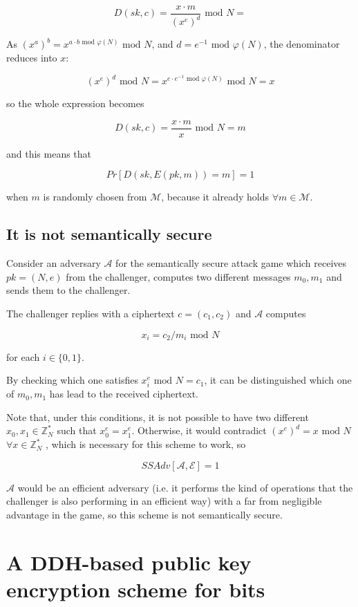 \documentclass{article}
\begin{document}
$$
  D(sk, c) = 
  \frac{ x \cdot m}
    {\left( x^e \right)^d} \text{ mod } N =
$$

As 
$(x^a)^b = x^{a \cdot b \text{ mod } \varphi(N)} \text{ mod } N$,
and $d = e^{-1} \text{ mod } \varphi(N)$, the denominator
reduces into $x$:

$$
  \left( x^e \right)^d \text{ mod } N =
    x^{e \cdot e^{-1} \text{ mod } \varphi(N)} \text{ mod } N =
      x
$$

so the whole expression becomes

$$
  D(sk, c) = \frac{x \cdot m}{x} \text{ mod } N = m
$$

and this means that

$$Pr[D(sk, E(pk, m)) = m] = 1$$

when $m$ is randomly chosen from $\mathcal{M}$, because it 
already holds $\forall m \in \mathcal{M}$.

\subsection{It is not semantically secure}

Consider an adversary $\mathcal{A}$ for the semantically secure 
attack game which receives $pk = (N, e)$ from the challenger, 
computes two different messages $m_0, m_1$ and sends them 
to the challenger.

The challenger replies with a ciphertext $c = (c_1, c_2)$ and
$\mathcal{A}$ computes 

$$x_i = c_2 / m_i \text{ mod } N$$

for each $i \in \{0,1\}$.

By checking which one satisfies 
$x_i^e \text{ mod } N = c_1$, it can be distinguished which
one of $m_0, m_1$ has lead to the received ciphertext.

Note that, under this conditions, it is not possible to have
two different $x_0, x_1 \in \mathbb{Z}_N^*$ such that
$x_0^e = x_1^e$. Otherwise, it would contradict 
$(x^e)^d = x \text{ mod } N$ $\forall x \in \mathbb{Z}_N^*$
, which is necessary for this scheme to work, so

$$SSAdv\left[\mathcal{A}, \mathcal{E}\right] = 1$$

$\mathcal{A}$ would be an efficient adversary (i.e. it performs
the kind of operations that the challenger is also performing 
in an efficient way) with a far from negligible advantage in the game, 
so this scheme is not semantically secure.

\section{A DDH-based public key encryption scheme for bits}
\end{document}
